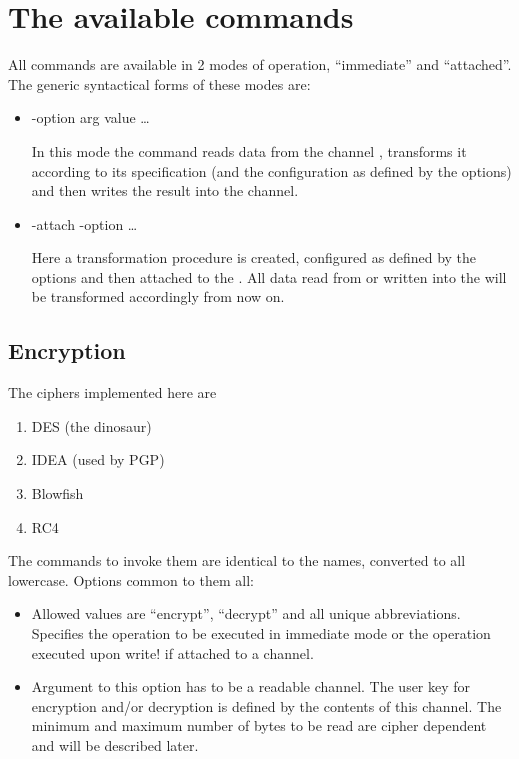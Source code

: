 \chapter {The available commands}

All commands are available in 2 modes of operation, ``immediate'' and
``attached''. The generic syntactical forms of these modes are:

\begin {itemize}
\item[immediate:]	 -option arg {value} \dots{}  

			In this mode the command reads data from the
			channel , transforms it according
			to its specification (and the configuration as
			defined by the options) and then writes the
			result into the  channel.

\item[attached:]	 -attach  -option  \dots{}

			Here a transformation procedure is created,
			configured as defined by the options and then
			attached to the . All data read
			from or written into the  will
			be transformed accordingly from now on.
\end   {itemize}


\section {Encryption}

The ciphers implemented here are

\begin {enumerate}
\item	DES 	(the dinosaur)
\item	IDEA	(used by PGP)
\item	Blowfish
\item	RC4
\end   {enumerate}

The commands to invoke them are identical to the names, converted to
all lowercase. Options common to them all:

\begin {itemize}
\item [-direction]	Allowed values are ``encrypt'', ``decrypt'' and all
			unique abbreviations. Specifies the operation
			to be executed in immediate mode or the
			operation executed upon write! if attached to
			a channel.
\item [-key]		Argument to this option has to be a readable
			channel. The user key for encryption and/or
			decryption is defined by the contents of this
			channel. The minimum and maximum number of
			bytes to be read are cipher dependent and will
			be described later.
\end   {itemize}

